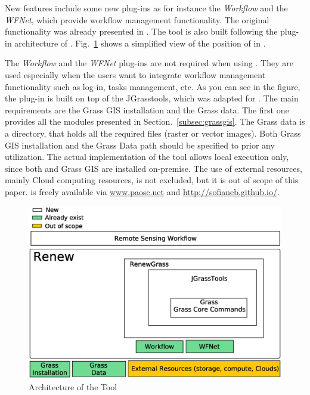 %
New features include some new plug-ins as for instance the \emph{Workflow} and the \emph{WFNet}, which provide workflow management functionality.
%
The original functionality was already presented in \cite{Jacob+02a}.
%
The \RenewGrass{} tool is also built following the plug-in architecture of \Renew{}.
%
Fig.~\ref{fig:renewgrass} shows a simplified view of the position of \RenewGrass{} in \Renew{}.
%

The \emph{Workflow} and the \emph{WFNet} plug-ins are not required when using \RenewGrass{}. 
%
They are used especially when the users want to integrate workflow management functionality such as log-in, tasks management, etc. 
%
As you can see in the figure, the \RenewGrass{} plug-in is built on top of the JGrasstools, which was adapted for \Renew{}.
%
The main requirements are the Grass GIS installation and the Grass data. 
%
The first one provides all the modules presented in Section.~\ref{subsec:grassgis}. 
%
The Grass data is a directory, that holds all the required files (raster or vector images).
%
Both Grass GIS installation and the Grass Data path should be specified to \RenewGrass{} prior any utilization.
%
The actual implementation of the tool allows local execution only, since both \Renew{} and Grass GIS are installed on-premise. 
%
The use of external resources, mainly Cloud computing resources, is not excluded, but it is out of scope of this paper.
%
\RenewGrass{} is freely available via \url{www.paose.net} and \url{http://sofianeb.github.io/}.
%


\begin{figure}[!t]
\centering
\includegraphics[width=\textwidth]{images/ArchitectureGrassRenew2}
\caption{Architecture of the \RenewGrass{} Tool}
\label{fig:renewgrass}
\end{figure}



